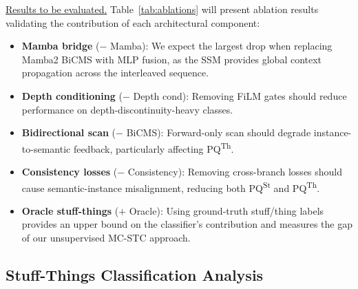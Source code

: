 \documentclass{article}
\begin{document}
\underline{Results to be evaluated.} Table~\ref{tab:ablations} will present ablation results validating the contribution of each architectural component:
\begin{itemize}
    \item \textbf{Mamba bridge} ($-$ Mamba): We expect the largest drop when replacing Mamba2 BiCMS with MLP fusion, as the SSM provides global context propagation across the interleaved sequence.
    \item \textbf{Depth conditioning} ($-$ Depth cond): Removing FiLM gates should reduce performance on depth-discontinuity-heavy classes.
    \item \textbf{Bidirectional scan} ($-$ BiCMS): Forward-only scan should degrade instance-to-semantic feedback, particularly affecting PQ\textsuperscript{Th}.
    \item \textbf{Consistency losses} ($-$ Consistency): Removing cross-branch losses should cause semantic-instance misalignment, reducing both PQ\textsuperscript{St} and PQ\textsuperscript{Th}.
    \item \textbf{Oracle stuff-things} ($+$ Oracle): Using ground-truth stuff/thing labels provides an upper bound on the classifier's contribution and measures the gap of our unsupervised MC-STC approach.
\end{itemize}


\subsection{Stuff-Things Classification Analysis}
\end{document}
